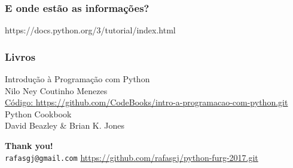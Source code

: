 \begin{frame}
    \frametitle{E onde estão as informações?}
    \centering \Large https://docs.python.org/3/tutorial/index.html
\end{frame}

\begin{frame}
    \frametitle{Livros}
    \vfill
    \large Introdução à Programação com Python \\ \normalsize
    Nilo Ney Coutinho Menezes \\
    \hfill\footnotesize\href{https://github.com/CodeBooks/intro-a-programacao-com-python.git}{Código: \url{https://github.com/CodeBooks/intro-a-programacao-com-python.git}}
    \vfill
    \large Python Cookbook \\ \normalsize
    David Beazley \& Brian K. Jones
    \vfill
\end{frame}

\begin{frame}
    \begin{flushright}
    \huge \textbf{Thank you!} \\
    \vfill
    \small \texttt{rafasgj@gmail.com}
    \vfill
    \small \href{https://github.com/rafasgj/python-furg-2017.git}{\url{https://github.com/rafasgj/python-furg-2017.git}}
    \end{flushright}
\end{frame}


